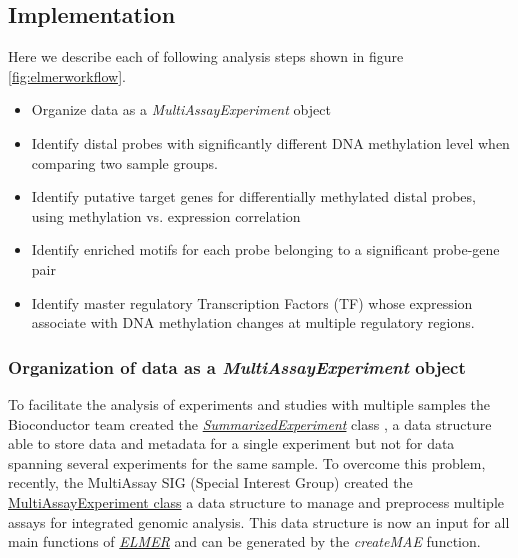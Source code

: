\subsection{Implementation}

Here we describe each of following analysis steps shown in figure \ref{fig:elmerworkflow}.

\begin{itemize}
    \item Organize data as a \textit{MultiAssayExperiment} object
	\item Identify distal probes with significantly different DNA methylation
   level when comparing two sample groups.
	\item Identify putative target genes for differentially methylated
   distal probes, using methylation vs. expression correlation
	\item Identify enriched motifs for each probe belonging
  to a significant probe-gene pair
	\item Identify master regulatory Transcription Factors (TF)
   whose expression associate with DNA methylation changes at multiple regulatory regions.
\end{itemize}




\subsubsection{Organization of data as a \textit{MultiAssayExperiment} object}

To facilitate the analysis of experiments and studies with multiple samples
the Bioconductor team created the \href{http://bioconductor.org/packages/SummarizedExperiment/}{\textit{SummarizedExperiment}} class \cite{huber2015orchestrating}, a data structure able to store data and metadata for a single experiment but not for data spanning several experiments for the same sample. To overcome this problem, recently, the MultiAssay SIG (Special Interest Group) created the \href{http://bioconductor.org/packages/MultiAssayExperiment/}{MultiAssayExperiment class} \cite{mae2017} a data structure to manage and preprocess multiple assays for
integrated genomic analysis. This data structure is now an input for all main functions
of \href{https://github.com/tiagochst/ELMER}{\textit{ELMER}} and can be generated
by the \textit{createMAE} function.


